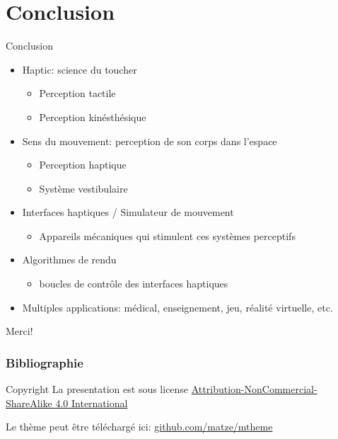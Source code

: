 \documentclass[compress, noflama]{beamer}
\begin{document}
\section{Conclusion} 
\begin{frame}{Conclusion}
	\begin{itemize}
		\item Haptic: science du toucher
		\begin{itemize}
		\item Perception tactile
		\item Perception kinésthésique
		\end{itemize}
		\item Sens du mouvement: perception de son corps dans l'espace
		\begin{itemize}
		\item Perception haptique
		\item Système vestibulaire
		\end{itemize}
		\item Interfaces haptiques / Simulateur de mouvement
		\begin{itemize}
		\item Appareils mécaniques qui stimulent ces systèmes perceptifs
\end{itemize}
		\item Algorithmes de rendu
		\begin{itemize}
		\item boucles de contrôle des interfaces haptiques
		\end{itemize}
		\item Multiples applications: médical, enseignement, jeu, réalité virtuelle, etc.
	\end{itemize}
\end{frame}	 
 
\begin{frame}[standout]
  Merci!
\end{frame} 
 
\appendix 
 


\begin{frame}[allowframebreaks]
\frametitle{Bibliographie}
  

\end{frame}

\begin{frame}{Copyright}
La presentation est sous license \href{https://creativecommons.org/licenses/by-nc-sa/4.0/}{Attribution-NonCommercial-ShareAlike 4.0 International}

\begin{center}\ccbyncsa\end{center}

Le thème peut être téléchargé ici: \url{github.com/matze/mtheme}


\end{frame}
\end{document}
